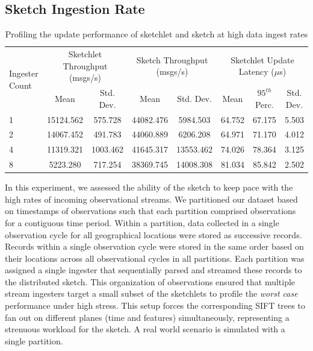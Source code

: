 \documentclass[9pt,journal,compsoc]{IEEEtran}
\begin{document}
\subsection{Sketch Ingestion Rate}
%
\begin{table}[bh!]
    \renewcommand{\arraystretch}{1.2}
    \caption{Profiling the update performance of sketchlet and sketch at high data ingest rates}
    \label{tab:throughput}
    \begin{center}
        \begin{tabularx}{0.9\textwidth}{|X|c|c|c|c|c|c|c|}
            \hline
            \multirow{2}{*}{Ingester Count} & \multicolumn{2}{c|}{\cellcolor[gray]{0.7}Sketchlet Throughput (msgs/s)} &\multicolumn{2}{c|}{\cellcolor[gray]{0.7}Sketch Throughput (msgs/s)} & \multicolumn{3}{c|}{\cellcolor[gray]{0.7}Sketchlet Update Latency ($\mu$s)} \\
            \cline{2-5}
             & \cellcolor[gray]{0.9}Mean & \cellcolor[gray]{0.9}Std. Dev.  &  \cellcolor[gray]{0.9}Mean & \cellcolor[gray]{0.9}Std. Dev.
             &  \cellcolor[gray]{0.9}Mean & \cellcolor[gray]{0.9}$95^{th}$ Perc. & \cellcolor[gray]{0.9}Std. Dev. \\
            \hline
            1 & 15124.562 & 575.728 & 44082.476 & 5984.503 & 64.752 & 67.175 & 5.503 \\
            \hline
            2 & 14067.452 & 491.783 & 44060.889 & 6206.208 & 64.971 & 71.170 & 4.012 \\
            \hline
            4 & 11319.321 & 1003.462 & 41645.317 & 13553.462 & 74.026 & 78.364 & 3.125 \\
            \hline
            8 & 5223.280 & 717.254 & 38369.745 & 14008.308 & 81.034 & 85.842 & 2.502 \\
            \hline
        \end{tabularx}
    \end{center}
\end{table}
%
In this experiment, we assessed the ability of the sketch to keep pace with the high rates of incoming observational streams.
We partitioned our dataset based on timestamps of observations such that each partition comprised observations for a contiguous time period.
Within a partition, data collected in a single observation cycle for all geographical locations were stored as successive records.
Records within a single observation cycle were stored in the same order based on their locations across all observational cycles in all partitions.
Each partition was assigned a single ingester that sequentially parsed and streamed these records to the distributed sketch.
This organization of observations ensured that multiple stream ingesters target a small subset of the sketchlets to profile the \textit{worst case} performance under high stress.
This setup forces the corresponding SIFT trees to fan out on different planes (time and features) simultaneously, representing a strenuous workload for the sketch.
A real world scenario is simulated with a single partition.
\end{document}
